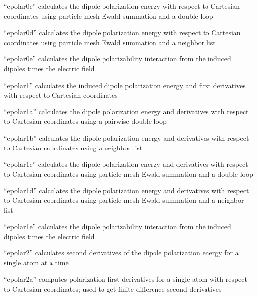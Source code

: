 \documentclass[letterpaper,11pt,english]{sphinxmanual}
\begin{document}
“epolar0c” calculates the dipole polarization energy with respect
to Cartesian coordinates using particle mesh Ewald summation and
a double loop


“epolar0d” calculates the dipole polarization energy with respect
to Cartesian coordinates using particle mesh Ewald summation and
a neighbor list


“epolar0e” calculates the dipole polarizability interaction
from the induced dipoles times the electric field


“epolar1” calculates the induced dipole polarization energy
and first derivatives with respect to Cartesian coordinates


“epolar1a” calculates the dipole polarization energy and
derivatives with respect to Cartesian coordinates using a
pairwise double loop


“epolar1b” calculates the dipole polarization energy and
derivatives with respect to Cartesian coordinates using a
neighbor list


“epolar1c” calculates the dipole polarization energy and
derivatives with respect to Cartesian coordinates using
particle mesh Ewald summation and a double loop


“epolar1d” calculates the dipole polarization energy and
derivatives with respect to Cartesian coordinates using
particle mesh Ewald summation and a neighbor list


“epolar1e” calculates the dipole polarizability interaction
from the induced dipoles times the electric field


“epolar2” calculates second derivatives of the dipole polarization
energy for a single atom at a time


“epolar2a” computes polarization first derivatives for a single
atom with respect to Cartesian coordinates; used to get finite
difference second derivatives
\end{document}
